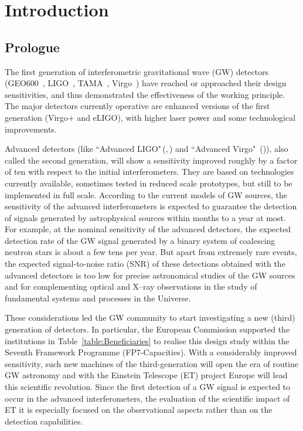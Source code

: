 \chapter{Introduction}
\label{chap:Intro}

%
%
%
\section[Prologue]{Prologue}
\label{Prologue}
The first generation of interferometric gravitational wave (GW) detectors  (GEO600~\cite{GEO600Grote2008}, LIGO~\cite{Abbott2009}, TAMA~\cite{Arai2008}, Virgo~\cite{VirgoStatus2008}) have reached or approached their design sensitivities, and thus demonstrated the effectiveness of the working principle. 
The major detectors currently operative are enhanced versions of the first generation (Virgo+ and eLIGO), with higher laser power and some technological improvements.

Advanced detectors (like ``Advanced LIGO"\,(\cite{AdvancedLIGOReference2009},\,\cite{aLIGO}) and ``Advanced Virgo" \,(\cite{AdV2009})), also called the second generation, will show a sensitivity improved roughly by a factor of ten with respect to the initial interferometers. They are based on technologies currently available, sometimes tested in reduced scale prototypes, but still to be implemented in full scale. 
According to the current models of GW sources, the sensitivity of the advanced interferometers is expected to guarantee the detection of signals generated by astrophysical sources within months to a year at most. For example, at the nominal sensitivity of the advanced detectors, the expected detection rate of the GW signal generated by a binary system of coalescing neutron stars is about a few tens per year. But apart from extremely rare events, the expected signal-to-noise ratio (SNR) of these detections obtained with the advanced detectors is too low for precise astronomical studies of the GW sources and for complementing optical and X--ray observations in the study of fundamental systems and processes in the Universe.

These considerations led the GW community to start investigating a new (third) generation of detectors. In particular, the European Commission supported the institutions in Table~\ref{table:Beneficiaries} to realise this design study within the Seventh Framework Programme (FP7-Capacities). With a considerably 
improved sensitivity, such new machines of the third-generation will open the era of routine GW astronomy and with the Einstein Telescope (ET) project Europe will lead this scientific revolution. Since the first detection of a GW signal is expected to occur in the advanced interferometers, the evaluation of the scientific impact of ET it is especially focused on the observational aspects rather than on the detection capabilities.

